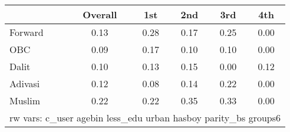 \begin{tabular}{l*{5}{c}}
\toprule
            &\multicolumn{1}{c}{Overall}&\multicolumn{1}{c}{1st}&\multicolumn{1}{c}{2nd}&\multicolumn{1}{c}{3rd}&\multicolumn{1}{c}{4th}\\
\midrule
\midrule
Forward     &        0.13&        0.28&        0.17&        0.25&        0.00\\
OBC         &        0.09&        0.17&        0.10&        0.10&        0.00\\
Dalit       &        0.10&        0.13&        0.15&        0.00&        0.12\\
Adivasi     &        0.12&        0.08&        0.14&        0.22&        0.00\\
Muslim      &        0.22&        0.22&        0.35&        0.33&        0.00\\
\bottomrule
\multicolumn{6}{l}{\footnotesize rw vars: c\_user agebin less\_edu urban hasboy parity\_bs groups6}\\
\end{tabular}
